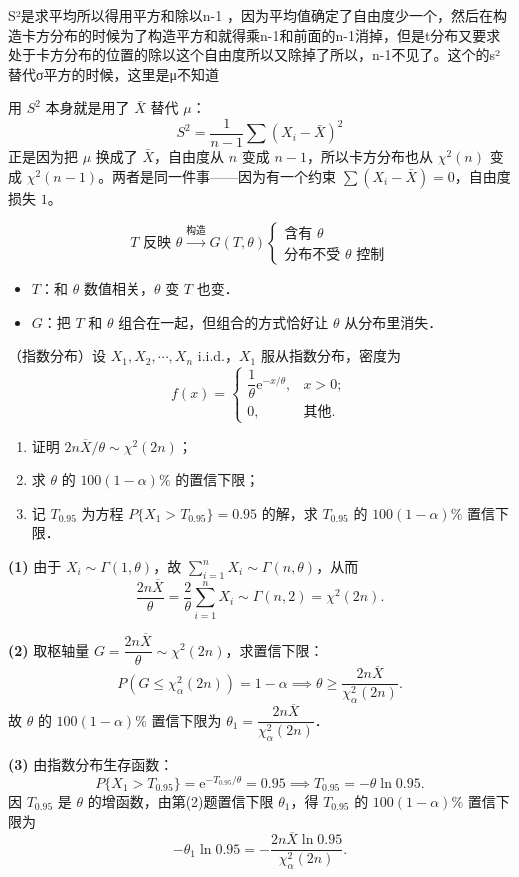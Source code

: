 \begin{dxtips}[n-1去哪里了]
    S²是求平均所以得用平方和除以n-1 ，因为平均值确定了自由度少一个，然后在构造卡方分布的时候为了构造平方和就得乘n-1和前面的n-1消掉，但是t分布又要求处于卡方分布的位置的除以这个自由度所以又除掉了所以，n-1不见了。这个的s²替代σ平方的时候，这里是μ不知道
\end{dxtips}
\begin{dxtips}
用 $S^2$ 本身就是用了 $\bar{X}$ 替代 $\mu$：
$$S^2 = \frac{1}{n-1}\sum(X_i - \bar{X})^2$$
正是因为把 $\mu$ 换成了 $\bar{X}$，自由度从 $n$ 变成 $n-1$，所以卡方分布也从 $\chi^2(n)$ 变成 $\chi^2(n-1)$。两者是同一件事——因为有一个约束 $\sum(X_i - \bar{X}) = 0$，自由度损失 $1$。
\end{dxtips}
\begin{note}
\[
T \text{ 反映 } \theta \xrightarrow{\text{构造}} G(T,\theta) \begin{cases} \text{含有 } \theta \\ \text{分布不受 } \theta \text{ 控制} \end{cases}
\]
\begin{itemize}
    \item $T$：和 $\theta$ 数值相关，$\theta$ 变 $T$ 也变．
    \item $G$：把 $T$ 和 $\theta$ 组合在一起，但组合的方式恰好让 $\theta$ 从分布里消失．
\end{itemize}
\end{note}
\begin{homework}[3]
（指数分布）设 $X_1, X_2, \cdots, X_n$ i.i.d.，$X_1$ 服从指数分布，密度为
\[
f(x) = \begin{cases} \dfrac{1}{\theta} \mathrm{e}^{-x/\theta}, & x > 0; \\ 0, & \text{其他}. \end{cases}
\]
\begin{enumerate}[(1)]
    \item 证明 $2n\overline{X}/\theta \sim \chi^2(2n)$；
    \item 求 $\theta$ 的 $100(1-\alpha)\%$ 的置信下限；
    \item 记 $T_{0.95}$ 为方程 $P\{X_1 > T_{0.95}\} = 0.95$ 的解，求 $T_{0.95}$ 的 $100(1-\alpha)\%$ 置信下限．
\end{enumerate}
\end{homework}
\begin{solution}
\textbf{(1)} 由于 $X_i \sim \Gamma(1, \theta)$，故 $\sum_{i=1}^n X_i \sim \Gamma(n, \theta)$，从而
\[
\frac{2n\overline{X}}{\theta} = \frac{2}{\theta}\sum_{i=1}^n X_i \sim \Gamma(n, 2) = \chi^2(2n).
\]

\textbf{(2)} 取枢轴量 $G = \dfrac{2n\overline{X}}{\theta} \sim \chi^2(2n)$，求置信下限：
\[
P\!\left(G \leqslant \chi^2_\alpha(2n)\right) = 1 - \alpha \implies \theta \geqslant \frac{2n\overline{X}}{\chi^2_\alpha(2n)}.
\]
故 $\theta$ 的 $100(1-\alpha)\%$ 置信下限为 $\theta_1 = \dfrac{2n\overline{X}}{\chi^2_\alpha(2n)}$．

\textbf{(3)} 由指数分布生存函数：
\[
P\{X_1 > T_{0.95}\} = \mathrm{e}^{-T_{0.95}/\theta} = 0.95 \implies T_{0.95} = -\theta\ln 0.95.
\]
因 $T_{0.95}$ 是 $\theta$ 的增函数，由第(2)题置信下限 $\theta_1$，得 $T_{0.95}$ 的 $100(1-\alpha)\%$ 置信下限为
\[
-\theta_1\ln 0.95 = -\frac{2n\overline{X}\ln 0.95}{\chi^2_\alpha(2n)}.
\]
\end{solution}
